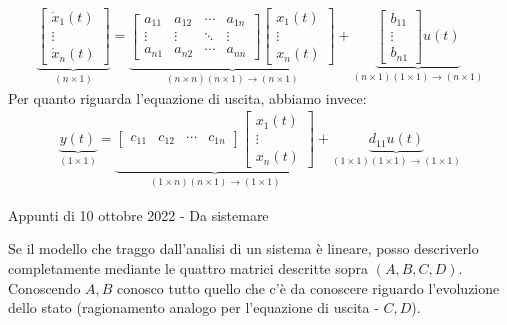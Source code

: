 \documentclass[a4paper]{report}
\begin{document}
\begin{align*}
		\underbrace{\begin{bmatrix}
			\dot x_1(t) \\
			\vdots \\
			\dot x_n(t)
		\end{bmatrix}}_{(n\times 1)} = 
		\underbrace{\begin{bmatrix}
			a_{11} & a_{12} & \cdots &a_{1n} \\
			\vdots & \vdots & \ddots & \vdots \\
			a_{n1} & a_{n2} & \cdots &a_{nn}
		\end{bmatrix} \begin{bmatrix}
			x_1(t) \\ \vdots \\ x_n(t)
		\end{bmatrix}}_{(n \times n)(n\times 1) \rightarrow (n\times 1)} + \underbrace{\begin{bmatrix}
			b_{11} \\ \vdots \\ b_{n1} 
		\end{bmatrix} u(t)}_{(n \times 1)(1\times 1) \rightarrow (n\times 1)}
	\end{align*}
	Per quanto riguarda l'equazione di uscita, abbiamo invece:
		\begin{align*}
		\underbrace{
			y(t)}_{(1\times 1)} = 
		\underbrace{\begin{bmatrix}
			c_{11} & c_{12} & \cdots &c_{1n}
		\end{bmatrix} \begin{bmatrix}
			x_1(t) \\ \vdots \\ x_n(t)
		\end{bmatrix}}_{(1 \times n)(n\times 1) \rightarrow (1\times 1)} + \underbrace{
			d_{11} u(t)}_{(1 \times 1)(1\times 1) \rightarrow (1\times 1)}
	\end{align*}
	
\bb

\starbreak
\starbreak

\begin{center}
Appunti di 10 ottobre 2022 - Da sistemare
\end{center}

Se il modello che traggo dall'analisi di un sistema è lineare, posso descriverlo completamente mediante le quattro matrici descritte sopra $(A,B,C,D)$. Conoscendo $A,B$ conosco tutto quello che c'è da conoscere riguardo l'evoluzione dello stato (ragionamento analogo per l'equazione di uscita - $C,D$).
\end{document}
